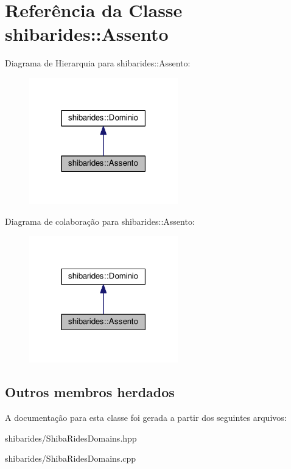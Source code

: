 \hypertarget{classshibarides_1_1Assento}{}\section{Referência da Classe shibarides\+:\+:Assento}
\label{classshibarides_1_1Assento}


Diagrama de Hierarquia para shibarides\+:\+:Assento\+:\nopagebreak
\begin{figure}[H]
\begin{center}
\leavevmode
\includegraphics[width=183pt]{classshibarides_1_1Assento__inherit__graph}
\end{center}
\end{figure}


Diagrama de colaboração para shibarides\+:\+:Assento\+:\nopagebreak
\begin{figure}[H]
\begin{center}
\leavevmode
\includegraphics[width=183pt]{classshibarides_1_1Assento__coll__graph}
\end{center}
\end{figure}
\subsection*{Outros membros herdados}


A documentação para esta classe foi gerada a partir dos seguintes arquivos\+:\begin{DoxyCompactItemize}
\item 
shibarides/Shiba\+Rides\+Domains.\+hpp\item 
shibarides/Shiba\+Rides\+Domains.\+cpp\end{DoxyCompactItemize}
